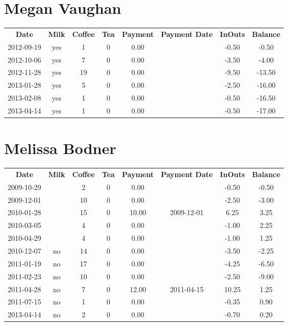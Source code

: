 \section{Megan Vaughan}

\begin{center}
\begin{tabular}{cccccccc}
\textbf{Date} & \textbf{Milk} & \textbf{Coffee} & \textbf{Tea} & \textbf{Payment} & \textbf{Payment Date} & \textbf{InOuts} & \textbf{Balance} \\
2012-09-19 & yes &  1 & 0 & 0.00 &  & -0.50 &  -0.50\\ 
2012-10-06 & yes &  7 & 0 & 0.00 &  & -3.50 &  -4.00\\ 
2012-11-28 & yes & 19 & 0 & 0.00 &  & -9.50 & -13.50\\ 
2013-01-28 & yes &  5 & 0 & 0.00 &  & -2.50 & -16.00\\ 
2013-02-08 & yes &  1 & 0 & 0.00 &  & -0.50 & -16.50\\ 
2013-04-14 & yes &  1 & 0 & 0.00 &  & -0.50 & -17.00
\end{tabular}
\end{center}

\section{Melissa Bodner}

\begin{center}
\begin{tabular}{cccccccc}
\textbf{Date} & \textbf{Milk} & \textbf{Coffee} & \textbf{Tea} & \textbf{Payment} & \textbf{Payment Date} & \textbf{InOuts} & \textbf{Balance} \\
2009-10-29 &  &  2 & 0 &  0.00 &  & -0.50 & -0.50\\ 
2009-12-01 &  & 10 & 0 &  0.00 &  & -2.50 & -3.00\\ 
2010-01-28 &  & 15 & 0 & 10.00 & 2009-12-01 &  6.25 &  3.25\\ 
2010-03-05 &  &  4 & 0 &  0.00 &  & -1.00 &  2.25\\ 
2010-04-29 &  &  4 & 0 &  0.00 &  & -1.00 &  1.25\\ 
2010-12-07 & no & 14 & 0 &  0.00 &  & -3.50 & -2.25\\ 
2011-01-19 & no & 17 & 0 &  0.00 &  & -4.25 & -6.50\\ 
2011-02-23 & no & 10 & 0 &  0.00 &  & -2.50 & -9.00\\ 
2011-04-28 & no &  7 & 0 & 12.00 & 2011-04-15 & 10.25 &  1.25\\ 
2011-07-15 & no &  1 & 0 &  0.00 &  & -0.35 &  0.90\\ 
2013-04-14 & no &  2 & 0 &  0.00 &  & -0.70 &  0.20
\end{tabular}
\end{center}

